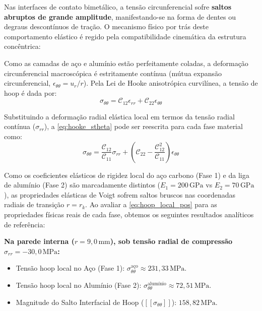 Nas interfaces de contato bimetálico, a tensão circunferencial sofre \textbf{saltos abruptos de grande amplitude}, manifestando-se na forma de dentes ou degraus descontínuos de tração. O mecanismo físico por trás deste comportamento elástico é regido pela compatibilidade cinemática da estrutura concêntrica:

Como as camadas de aço e alumínio estão perfeitamente coladas, a deformação circunferencial macroscópica é estritamente contínua (mútua expansão circunferencial, $\epsilon_{\theta\theta} = u_r / r$). Pela Lei de Hooke anisotrópica curvilínea, a tensão de hoop é dada por:
\begin{equation}
  \sigma_{\theta\theta} = \mathcal{C}_{12} \epsilon_{rr} + \mathcal{C}_{22} \epsilon_{\theta\theta}
  \label{eq:hooke_stheta}
\end{equation}

Substituindo a deformação radial elástica local em termos da tensão radial contínua ($\sigma_{rr}$), a \eqref{eq:hooke_stheta} pode ser reescrita para cada fase material como:
\begin{equation}
  \sigma_{\theta\theta} = \frac{\mathcal{C}_{12}}{\mathcal{C}_{11}} \sigma_{rr} + \left( \mathcal{C}_{22} - \frac{\mathcal{C}_{12}^2}{\mathcal{C}_{11}} \right) \epsilon_{\theta\theta}
  \label{eq:hoop_local_pos}
\end{equation}

Como os coeficientes elásticos de rigidez local do aço carbono (Fase 1) e da liga de alumínio (Fase 2) são marcadamente distintos ($E_1 = 200 \, \text{GPa}$ vs $E_2 = 70 \, \text{GPa}$), as propriedades elásticas de Voigt sofrem saltos bruscos nas coordenadas radiais de transição $r = r_k$. Ao avaliar a \eqref{eq:hoop_local_pos} para as propriedades físicas reais de cada fase, obtemos os seguintes resultados analíticos de referência:

\textbf{Na parede interna ($r = 9,0 \, \text{mm}$), sob tensão radial de compressão $\sigma_{rr} = -30,0 \, \text{MPa}$:}
\begin{itemize}
  \item Tensão hoop local no Aço (Fase 1): $\sigma_{\theta\theta}^{\text{aço}} \approx 231,33 \, \text{MPa}$.
  \item Tensão hoop local no Alumínio (Fase 2): $\sigma_{\theta\theta}^{\text{alumínio}} \approx 72,51 \, \text{MPa}$.
  \item Magnitude do Salto Interfacial de Hoop ($[[\sigma_{\theta\theta}]]$): \textbf{$158,82 \, \text{MPa}$}.
\end{itemize}

